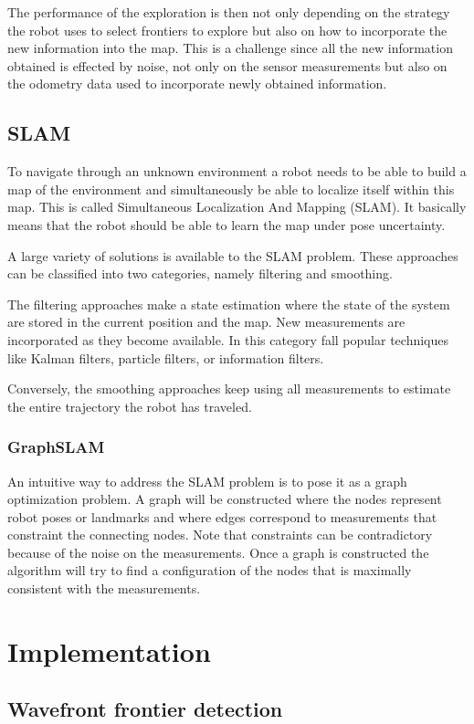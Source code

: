 \documentclass{ba-kecs}
\begin{document}
The performance of the exploration is then not only depending on the strategy the robot uses to select frontiers to explore but also on how to incorporate the new information into the map. This is a challenge since all the new information obtained is effected by noise, not only on the sensor measurements but also on the odometry data used to incorporate newly obtained information.

\subsection{SLAM}
To navigate through an unknown environment a robot needs to be able to build a map of the environment and simultaneously be able to localize itself within this map. This is called Simultaneous Localization And Mapping (SLAM). It basically means that the robot should be able to learn the map under pose uncertainty.

A large variety of solutions is available to the SLAM problem. These approaches can be classified into two categories, namely filtering and smoothing. 

The filtering approaches make a state estimation where the state of the system are stored in the current position and the map. New measurements are incorporated as they become available. In this category fall popular techniques like Kalman filters, particle filters, or information filters.

Conversely, the smoothing approaches keep using all measurements to estimate the entire trajectory the robot has traveled.

\subsubsection{GraphSLAM}
An intuitive way to address the SLAM problem is to pose it as a graph optimization problem. A graph will be constructed where the nodes represent robot poses or landmarks and where edges correspond to measurements that constraint the connecting nodes. Note that constraints can be contradictory because of the noise on the measurements. Once a graph is constructed the algorithm will try to find a configuration of the nodes that is maximally consistent with the measurements.

\section{Implementation}
\subsection{Wavefront frontier detection}
\end{document}
